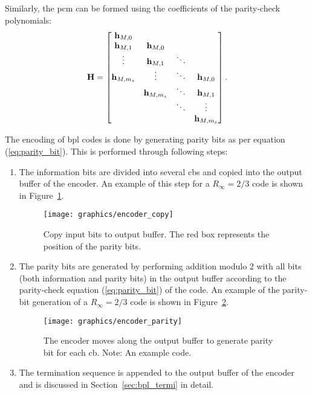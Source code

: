 Similarly, the \gls{pcm} can be formed using the coefficients of the parity-check polynomials:
\begin{align}\label{eq:bpl_pcm}
\mathbf{H}=
\begin{bmatrix}
\mathbf{h}_{M,0}\\
\mathbf{h}_{M,1} &\mathbf{h}_{M,0}\\
\vdots &\mathbf{h}_{M,1} &\ddots\\
\mathbf{h}_{M,m_s} &\vdots &\ddots &\mathbf{h}_{M,0}\\
&\mathbf{h}_{M,m_s} &\ddots &\mathbf{h}_{M,1}\\
& &\ddots &\vdots\\
& & &\mathbf{h}_{M,m_s}
\end{bmatrix}.
\end{align}

The encoding of \gls{bpl} codes is done by generating parity bits as per equation (\ref{eq:parity_bit}). This is performed through following steps:
\begin{enumerate}
  \item The information bits are divided into several \glspl{cb} and copied into the output buffer of the encoder. An example of this step for a $R_\infty=2/3$ code is shown in Figure~\ref{fig:encode_copy}.
  \begin{figure}[htbp]
    \centering
    \texttt{[image: graphics/encoder\_copy]}
    \caption{Copy input bits to output buffer. The red box represents the position of the parity bits.}
    \label{fig:encode_copy}
  \end{figure}
  \item The parity bits are generated by performing addition modulo 2 with all bits (both information and parity bits) in the output buffer according to the parity-check equation (\ref{eq:parity_bit}) of the code. An example of the parity-bit generation of a $R_\infty=2/3$ code is shown in Figure~\ref{fig:encoder_paritygen}.
   \begin{figure}[htbp]
    \centering
    \texttt{[image: graphics/encoder\_parity]}
    \caption{The encoder moves along the output buffer to generate parity bit for each \gls{cb}. Note: An example code.}
    \label{fig:encoder_paritygen}
  \end{figure}
  \item The termination sequence is appended to the output buffer of the encoder and is discussed in Section~\ref{sec:bpl_termi} in detail.
\end{enumerate}

